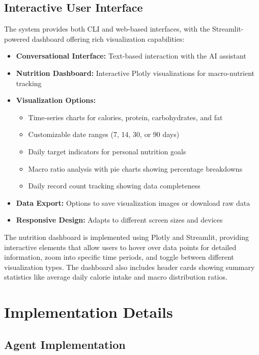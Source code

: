 \documentclass{ecai}
\begin{document}
\subsection{Interactive User Interface}

The system provides both CLI and web-based interfaces, with the Streamlit-powered dashboard offering rich visualization capabilities:

\begin{itemize}[noitemsep,topsep=0pt]
    \item \textbf{Conversational Interface:} Text-based interaction with the AI assistant
    \item \textbf{Nutrition Dashboard:} Interactive Plotly visualizations for macro-nutrient tracking
    \item \textbf{Visualization Options:}
    \begin{itemize}[noitemsep,topsep=0pt]
        \item Time-series charts for calories, protein, carbohydrates, and fat
        \item Customizable date ranges (7, 14, 30, or 90 days)
        \item Daily target indicators for personal nutrition goals
        \item Macro ratio analysis with pie charts showing percentage breakdowns
        \item Daily record count tracking showing data completeness
    \end{itemize}
    \item \textbf{Data Export:} Options to save visualization images or download raw data
    \item \textbf{Responsive Design:} Adapts to different screen sizes and devices
\end{itemize}

The nutrition dashboard is implemented using Plotly and Streamlit, providing interactive elements that allow users to hover over data points for detailed information, zoom into specific time periods, and toggle between different visualization types. The dashboard also includes header cards showing summary statistics like average daily calorie intake and macro distribution ratios.

\section{Implementation Details}

\subsection{Agent Implementation}
\end{document}
